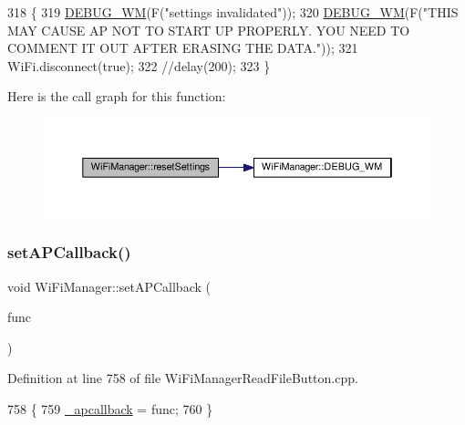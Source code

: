 \begin{DoxyCode}
318                                 \{
319   \hyperlink{class_wi_fi_manager_ae5f595c670ccbcf9a191baf50f5c7c26}{DEBUG\_WM}(F(\textcolor{stringliteral}{"settings invalidated"}));
320   \hyperlink{class_wi_fi_manager_ae5f595c670ccbcf9a191baf50f5c7c26}{DEBUG\_WM}(F(\textcolor{stringliteral}{"THIS MAY CAUSE AP NOT TO START UP PROPERLY. YOU NEED TO COMMENT IT OUT AFTER ERASING
       THE DATA."}));
321   WiFi.disconnect(\textcolor{keyword}{true});
322   \textcolor{comment}{//delay(200);}
323 \}
\end{DoxyCode}
Here is the call graph for this function\+:\nopagebreak
\begin{figure}[H]
\begin{center}
\leavevmode
\includegraphics[width=350pt]{d4/dc8/class_wi_fi_manager_a0027749816b6c66bc845d7c5db760a33_cgraph}
\end{center}
\end{figure}
\mbox{\label{class_wi_fi_manager_a353ab556f96020ad7a08e9a91cea8bea}} 
\subsubsection{\texorpdfstring{set\+A\+P\+Callback()}{setAPCallback()}}
{\footnotesize\ttfamily void Wi\+Fi\+Manager\+::set\+A\+P\+Callback (\begin{DoxyParamCaption}\item[{void($\ast$)(\hyperlink{class_wi_fi_manager}{Wi\+Fi\+Manager} $\ast$)}]{func }\end{DoxyParamCaption})}



Definition at line 758 of file Wi\+Fi\+Manager\+Read\+File\+Button.\+cpp.


\begin{DoxyCode}
758                                                                           \{
759   \hyperlink{class_wi_fi_manager_ad166247d94aef10a3a8aa34da1351b27}{\_apcallback} = func;
760 \}
\end{DoxyCode}
\mbox{\label{class_wi_fi_manager_a70007205081cd9bfe4123b65553adf42}} 

